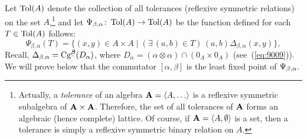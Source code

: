 Let $\operatorname{Tol}(A)$ denote the collection of all tolerances (reflexive symmetric relations)
on the set $A$,\footnote{Actually, a
  \emph{tolerance} of an algebra $\bA = \<A, \dots\>$
  is a reflexive symmetric subalgebra of $\mathbf{A} \times \mathbf{A}$.
  Therefore, the set of all tolerances of $\mathbf{A}$ forms an
  algebraic (hence complete) lattice.
  Of course, if $\mathbf{A} = \langle A, \emptyset\rangle$ is a set, then a tolerance is
  simply a reflexive symmetric binary relation on $A$. 
}
and let %
$\Psi_{\beta, \alpha} \colon \operatorname{Tol}(A) \to \operatorname{Tol}(A)$ be the function defined
for each $T \in  \operatorname{Tol}(A)$ follows:
\begin{equation}
  \label{eq:7}
  \Psi_{\beta, \alpha}(T)
  = \{ (x,y) \in A\times A \mid
  (\exists\, (a,b) \in T)\,
 (a,b) \mathrel{\Delta_{\beta, \alpha}} (x,y)\},
\end{equation}
Recall,
$\Delta_{\beta, \alpha} = \Cg^{\bbeta}(D_\alpha)$, where
$D_\alpha =(\alpha \otimes \alpha) \cap (0_A \times 0_A)$
(see~(\ref{eq:9009})).
We will prove below that the commutator $[\alpha, \beta]$ is the least fixed
point of $\Psi_{\beta, \alpha}$.


